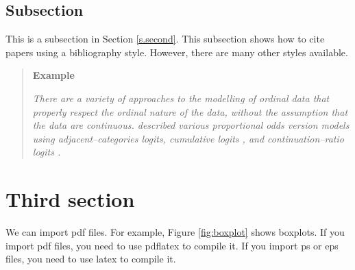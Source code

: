 \documentclass[12pt]{article}
\begin{document}
\subsection{Subsection}

\label{ss.a}

This is a subsection in Section \ref{s.second}. This subsection shows how to 
cite papers using a bibliography style.  However, there are many other styles 
available.

\begin{quote}
{\bf Example}

{\em There are a variety of approaches to the modelling of ordinal data
that properly respect the ordinal nature of the data, without the
assumption that the data are continuous.  \cite{Liu05}
 described various proportional odds version
models using adjacent--categories logits, cumulative logits
\citep{McC80}, and continuation--ratio logits \citep{McC89}.}
\end{quote}

\section{Third section}

\label{s.3rd}

We can import pdf files.  For example, Figure \ref{fig:boxplot} shows boxplots. 
If you import pdf files, you need to use pdflatex to 
compile it. If you import ps or eps files, you need to use latex to compile it. 
\end{document}
